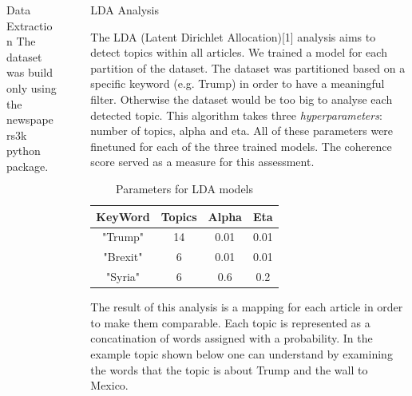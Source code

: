 \documentclass[final]{beamer}
\newlength{\sepwid}
\newlength{\onecolwid}
\begin{document}
\begin{frame}[t]
\begin{columns}[t]
\begin{column}{\onecolwid}
\begin{block}{Data Extraction}
    The dataset was build only using the newspapers3k python package.

\end{block}

\end{column} %

\begin{column}{\sepwid}\end{column} %

\begin{column}{\onecolwid} %




\begin{block}{LDA Analysis}

    The LDA (Latent Dirichlet Allocation)[1] analysis aims to detect topics within all articles. We trained a model for each partition of the dataset. The dataset was partitioned based on a specific keyword (e.g. Trump) in order to have a meaningful filter. Otherwise the dataset would be too big to analyse each detected topic. This algorithm takes three \textit{hyperparameters}: number of topics, alpha and eta. All of these parameters were finetuned for each of the three trained models. The coherence score served as a measure for this assessment. \linebreak
    
    \begin{table}    
    \begin{tabular}{c c c c}
    \hline
    KeyWord & Topics & Alpha & Eta  \\ [0.5ex]
    \hline\hline
    "Trump" & 14 & 0.01 & 0.01 \\
    "Brexit" & 6 & 0.01 & 0.01 \\
    "Syria" & 6 & 0.6 & 0.2 \\
    \end{tabular}
    \caption{Parameters for LDA models}
    \end{table}
    
     The result of this analysis is a mapping for each article in order to make them comparable. Each topic is represented as a concatination of words assigned with a probability. In the example topic shown below one can understand by examining the words that the topic is about Trump and the wall to Mexico. \linebreak
     

\end{block}
\end{column}
\end{columns}
\end{frame}
\end{document}
